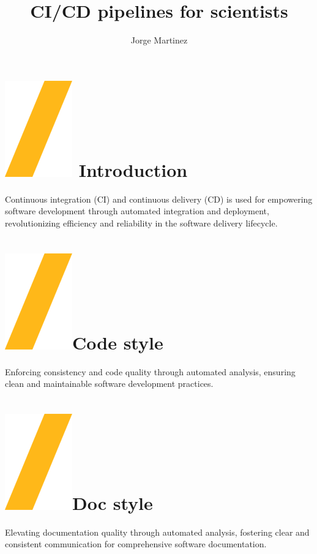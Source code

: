 \documentclass[a0paper,fleqn]{src/betterposter}
\begin{document}
{\title{CI\slash CD pipelines for scientists}
\author{Jorge Martinez}

\section{\includegraphics[height=\fontcharht\font`\S]{img/general/slash.png} Introduction}
Continuous integration (CI) and continuous delivery (CD) is used for empowering
software development through automated integration and deployment,
revolutionizing efficiency and reliability in the software delivery lifecycle.

\section{\includegraphics[height=\fontcharht\font`\S]{img/general/slash.png}Code style}
Enforcing consistency and code quality through automated analysis, ensuring
clean and maintainable software development practices.

\section{\includegraphics[height=\fontcharht\font`\S]{img/general/slash.png}Doc style}
Elevating documentation quality through automated analysis, fostering clear and
consistent communication for comprehensive software documentation.

}
\end{document}
